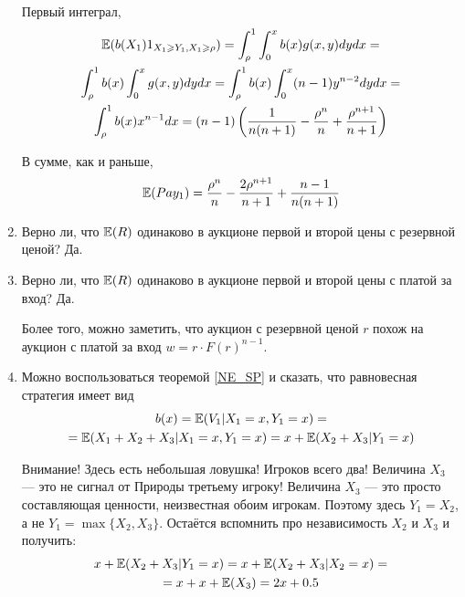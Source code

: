 \begin{enumerate}
Первый интеграл,
\begin{multline}
\operatorname{\mathbb{E}}(b(X_{1})1_{X_{1}\geqslant Y_{1},X_{1}\geqslant \rho})=\int_{\rho}^{1} \int_{0}^{x} b(x)g(x,y)dy dx =\\
\int_{\rho}^{1} b(x) \int_{0}^{x} g(x,y)dy dx =\int_{\rho}^{1} b(x) \int_{0}^{x} (n-1) y^{n-2} dy dx =\\
\int_{\rho}^{1}b(x) x^{n-1} dx=(n-1)\left(\frac{1}{n(n+1)}-\frac{\rho^{n}}{n}+\frac{\rho^{n+1}}{n+1}\right)
\end{multline}

В сумме, как и раньше,
\begin{equation}
\operatorname{\mathbb{E}}(Pay_{1})=\frac{\rho^{n}}{n}-\frac{2\rho^{n+1}}{n+1}+\frac{n-1}{n(n+1)}
\end{equation}

\item  Верно ли, что $ \operatorname{\mathbb{E}}(R) $ одинаково в аукционе первой и второй цены с резервной ценой? Да.

\item  Верно ли, что $ \operatorname{\mathbb{E}}(R) $ одинаково в аукционе первой и второй цены с платой за вход? Да.

Более того, можно заметить, что аукцион с резервной ценой $ r $ похож на аукцион с платой за вход $ w=r\cdot F(r)^{n-1} $.

\item %
Можно воспользоваться теоремой \ref{NE_SP} и сказать, что равновесная стратегия имеет вид
\begin{multline}
b(x)=\operatorname{\mathbb{E}}(V_{1}|X_{1}=x,Y_{1}=x)=\\
=\operatorname{\mathbb{E}}(X_{1}+X_{2}+X_{3}|X_{1}=x,Y_{1}=x)=x+\operatorname{\mathbb{E}}(X_{2}+X_{3}|Y_{1}=x)
\end{multline}

Внимание! Здесь есть небольшая ловушка! Игроков всего два! Величина $X_{3} $ — это не сигнал от Природы третьему игроку! Величина $ X_{3} $ — это просто составляющая ценности, неизвестная обоим игрокам. Поэтому здесь $ Y_{1}=X_{2} $, а не $ Y_{1}=\max\{X_{2},X_{3}\} $. Остаётся вспомнить про независимость $ X_{2} $ и $ X_{3} $ и получить:
\begin{multline}
x+\operatorname{\mathbb{E}}(X_{2}+X_{3}|Y_{1}=x)=x+\operatorname{\mathbb{E}}(X_{2}+X_{3}|X_{2}=x)=\\
=x+x+\operatorname{\mathbb{E}}(X_{3})=2x+0.5
\end{multline}


\end{enumerate}
